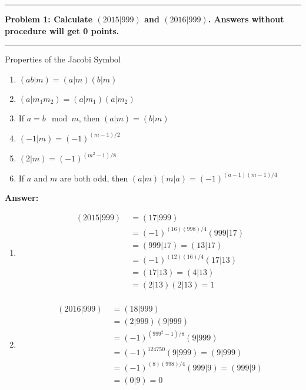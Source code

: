 \documentclass[11pt]{article}
\newcommand\question[2]{\vspace{.25in}\hrule\textbf{#1: #2}\vspace{.5em}\hrule\vspace{.10in}}
\renewcommand\part[1]{\vspace{.10in}\textbf{#1}}
\begin{document}
\raggedright
\newcommand\NAME{Shiang-Yun Yang 楊翔雲}  %
\newcommand\ANDREWID{R04922067}     %
\newcommand\HWNUM{5}              %



\question{Problem 1}{Calculate $(2015|999)$ and $(2016|999)$. \textbf{Answers without procedure will get 0 points.}}

Properties of the Jacobi Symbol

\begin{enumerate}
	\item 
		$(ab|m) = (a|m)(b|m)$
	\item 
		$(a|m_1 m_2) = (a|m_1)(a|m_2)$
	\item
		If $a = b \mod m$, then $(a|m) = (b|m)$
	\item
		$(-1|m) = (-1)^{(m-1)/2}$
	\item 
		$(2|m) = (-1)^{(m^2-1)/8}$
	\item
		If $a$ and $m$ are both odd, then $(a|m)(m|a) = (-1)^{(a-1)(m-1)/4}$
\end{enumerate}

\part{Answer:} 

\begin{enumerate}
	\item \begin{equation} \label{eq1}
		\begin{split}
		(2015|999) \; & = (17|999) \\
				   & = (-1)^{(16)(998)/4}(999|17)\\
				   & = (999|17) = (13|17)\\
				   & = (-1)^{(12)(16)/4}(17|13)\\
				   & = (17|13) = (4|13)\\
				   & = (2|13) (2|13) = 1\\
		\end{split}
		\end{equation}
	\item \begin{equation} \label{eq2}
		\begin{split}
		(2016|999) \; &= (18|999) \\
				   &= (2|999)(9|999)\\
				   &= (-1)^{(999^2-1)/8}(9|999) \\
				   &= (-1)^{124750}(9|999) = (9|999) \\
				   &= (-1)^{(8)(998)/4}(999|9) = (999|9)\\
				   &= (0|9) = 0
		\end{split}
		\end{equation}
\end{enumerate}
\end{document}
